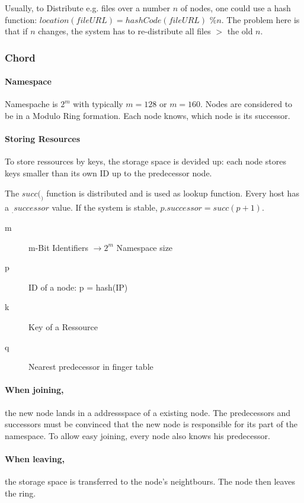 Usually, to Distribute e.g. files over a number $n$ of nodes, one could use a hash function: $location(fileURL) = hashCode(fileURL) \text{ \% } n$. The problem here is that if $n$ changes, the system has to re-distribute all files $>$ the old $n$.

\subsubsection{Chord}

\paragraph{Namespace} Namespache is $2^m$ with typically $m = 128$ or $m = 160$. Nodes are considered to be in a Modulo Ring formation. Each node knows, which node is its successor.

\paragraph{Storing Resources} To store ressources by keys, the storage space is devided up: each node stores keys smaller than its own ID up to the predecessor node.

The $succ(_)$ function is distributed and is used as lookup function. Every host has a $_.successor$ value. If the system is stable, $p.successor = succ(p+1)$.

\begin{description}
	\item[m] m-Bit Identifiers $\rightarrow 2^m$ Namespace size 
	\item[p] ID of a node: p = hash(IP)
	\item[k] Key of a Ressource
	\item[q] Nearest predecessor in finger table
\end{description}

\paragraph{When joining,} the new node lands in a addressspace of a existing node. The predecessors and successors must be convinced that the new node is responsible for its part of the namespace. To allow easy joining, every node also knows his predecessor.

\paragraph{When leaving,} the storage space is transferred to the node's neightbours. The node then leaves the ring.

